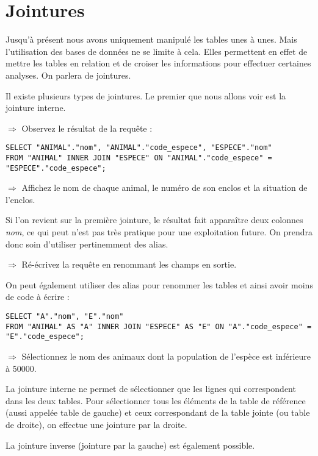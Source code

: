 \documentclass[11pt]{article}
\begin{document}
			
			
		\section{Jointures}
			Jusqu'à présent nous avons uniquement manipulé les tables unes à unes. Mais l'utilisation des bases de données ne se limite à cela. Elles permettent en effet de mettre les tables en relation et de croiser les informations pour effectuer certaines analyses. On parlera de jointures.
		
			Il existe plusieurs types de jointures. Le premier que nous allons voir est la jointure interne.
		
			$\Rightarrow$ Observez le résultat de la requête :
			\begin{lstlisting}
SELECT "ANIMAL"."nom", "ANIMAL"."code_espece", "ESPECE"."nom" 
FROM "ANIMAL" INNER JOIN "ESPECE" ON "ANIMAL"."code_espece" = "ESPECE"."code_espece";
			\end{lstlisting}
			
			$\Rightarrow$ Affichez le nom de chaque animal, le numéro de son enclos et la situation de l'enclos.
			
			Si l'on revient sur la première jointure, le résultat fait apparaître deux colonnes \textit{nom}, ce qui peut n'est pas très pratique pour une exploitation future. On prendra donc soin d'utiliser pertinemment des alias.
			
			$\Rightarrow$ Ré-écrivez la requête en renommant les champs en sortie.
			
			On peut également utiliser des alias pour renommer les tables et ainsi avoir moins de code à écrire :
			\begin{lstlisting}
SELECT "A"."nom", "E"."nom" 
FROM "ANIMAL" AS "A" INNER JOIN "ESPECE" AS "E" ON "A"."code_espece" = "E"."code_espece";
			\end{lstlisting}
			
			$\Rightarrow$ Sélectionnez le nom des animaux dont la population de l'espèce est inférieure à 50000.
			
			La jointure interne ne permet de sélectionner que les lignes qui correspondent dans les deux tables. Pour sélectionner tous les éléments de la table de référence (aussi appelée table de gauche) et ceux correspondant de la table jointe (ou table de droite), on effectue une jointure par la droite.
			
			La jointure inverse (jointure par la gauche) est également possible.
			
\end{document}
